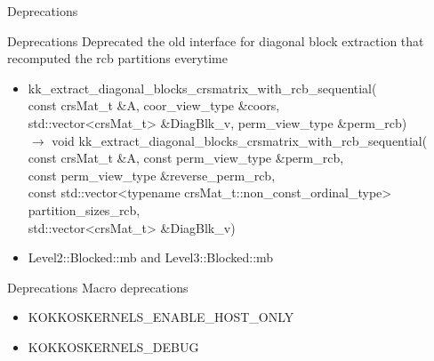 \begin{frame}[fragile]

  {\Huge Deprecations}

  \vspace{10pt}

\end{frame}

\begin{frame}[fragile]{Deprecations}
  Deprecated the old interface for diagonal block extraction that recomputed the rcb partitions everytime
  \begin{itemize}
  \item {\ttfamily kk\_extract\_diagonal\_blocks\_crsmatrix\_with\_rcb\_sequential(\\
    \hspace{2em}const crsMat\_t \&A, coor\_view\_type \&coors,\\
    \hspace{2em}std::vector<crsMat\_t> \&DiagBlk\_v, perm\_view\_type \&perm\_rcb)}\\
    $\rightarrow$ {\ttfamily void kk\_extract\_diagonal\_blocks\_crsmatrix\_with\_rcb\_sequential(\\
    \hspace{2em}const crsMat\_t \&A, const perm\_view\_type \&perm\_rcb,\\
    \hspace{2em}const perm\_view\_type \&reverse\_perm\_rcb,\\
    \hspace{2em}const std::vector<typename crsMat\_t::non\_const\_ordinal\_type> partition\_sizes\_rcb,\\
    \hspace{2em}std::vector<crsMat\_t> \&DiagBlk\_v)}
  \item {\ttfamily Level2::Blocked::mb} and {\ttfamily Level3::Blocked::mb}
  \end{itemize}
\end{frame}

\begin{frame}[fragile]{Deprecations}
  Macro deprecations
  \begin{itemize}
    \item {\ttfamily KOKKOSKERNELS\_ENABLE\_HOST\_ONLY}
    \item {\ttfamily KOKKOSKERNELS\_DEBUG}
  \end{itemize}
\end{frame}
